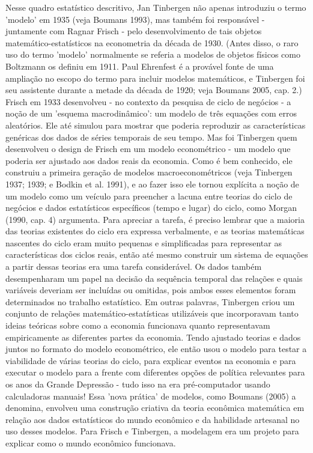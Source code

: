 \documentclass[12pt]{article}
\begin{document}
Nesse quadro estatístico descritivo, Jan Tinbergen não apenas introduziu o termo 'modelo' em 1935 (veja Boumans 1993), mas também foi responsável - juntamente com Ragnar Frisch - pelo desenvolvimento de tais objetos matemático-estatísticos na econometria da década de 1930. (Antes disso, o raro uso do termo 'modelo' normalmente se referia a modelos de objetos físicos como Boltzmann os definiu em 1911. Paul Ehrenfest é a provável fonte de uma ampliação no escopo do termo para incluir modelos matemáticos, e Tinbergen foi seu assistente durante a metade da década de 1920; veja Boumans 2005, cap. 2.) Frisch em 1933 desenvolveu - no contexto da pesquisa de ciclo de negócios - a noção de um 'esquema macrodinâmico': um modelo de três equações com erros aleatórios. Ele até simulou para mostrar que poderia reproduzir as características genéricas dos dados de séries temporais de seu tempo. Mas foi Tinbergen quem desenvolveu o design de Frisch em um modelo econométrico - um modelo que poderia ser ajustado aos dados reais da economia. Como é bem conhecido, ele construiu a primeira geração de modelos macroeconométricos (veja Tinbergen 1937; 1939; e Bodkin et al. 1991), e ao fazer isso ele tornou explícita a noção de um modelo como um veículo para preencher a lacuna entre teorias do ciclo de negócios e dados estatísticos específicos (tempo e lugar) do ciclo, como Morgan (1990, cap. 4) argumenta. Para apreciar a tarefa, é preciso lembrar que a maioria das teorias existentes do ciclo era expressa verbalmente, e as teorias matemáticas nascentes do ciclo eram muito pequenas e simplificadas para representar as características dos ciclos reais, então até mesmo construir um sistema de equações a partir dessas teorias era uma tarefa considerável. Os dados também desempenharam um papel na decisão da sequência temporal das relações e quais variáveis deveriam ser incluídas ou omitidas, pois ambos esses elementos foram determinados no trabalho estatístico. Em outras palavras, Tinbergen criou um conjunto de relações matemático-estatísticas utilizáveis que incorporavam tanto ideias teóricas sobre como a economia funcionava quanto representavam empiricamente as diferentes partes da economia. Tendo ajustado teorias e dados juntos no formato do modelo econométrico, ele então usou o modelo para testar a viabilidade de várias teorias do ciclo, para explicar eventos na economia e para executar o modelo para a frente com diferentes opções de política relevantes para os anos da Grande Depressão - tudo isso na era pré-computador usando calculadoras manuais! Essa 'nova prática' de modelos, como Boumans (2005) a denomina, envolveu uma construção criativa da teoria econômica matemática em relação aos dados estatísticos do mundo econômico e da habilidade artesanal no uso desses modelos. Para Frisch e Tinbergen, a modelagem era um projeto para explicar como o mundo econômico funcionava.
\end{document}
